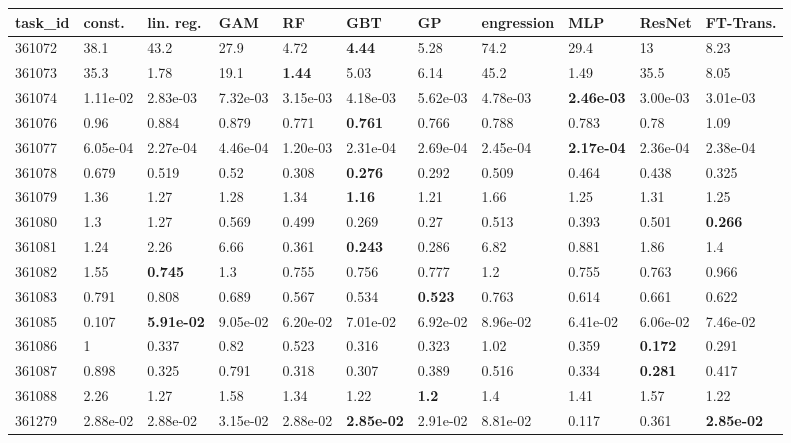 \begin{table}[ht!]
\centering
\begingroup\footnotesize
\begin{tabular}{lllllllllll}
  \hline
\hline
task\_id & const. & lin. reg. & GAM & RF & GBT & GP & engression & MLP & ResNet & FT-Trans. \\ 
  \hline
361072 & 38.1 & 43.2 & 27.9 & 4.72 & \textbf{4.44} & 5.28 & 74.2 & 29.4 & 13 & 8.23 \\ 
  361073 & 35.3 & 1.78 & 19.1 & \textbf{1.44} & 5.03 & 6.14 & 45.2 & 1.49 & 35.5 & 8.05 \\ 
  361074 & 1.11e-02 & 2.83e-03 & 7.32e-03 & 3.15e-03 & 4.18e-03 & 5.62e-03 & 4.78e-03 & \textbf{2.46e-03} & 3.00e-03 & 3.01e-03 \\ 
  361076 & 0.96 & 0.884 & 0.879 & 0.771 & \textbf{0.761} & 0.766 & 0.788 & 0.783 & 0.78 & 1.09 \\ 
  361077 & 6.05e-04 & 2.27e-04 & 4.46e-04 & 1.20e-03 & 2.31e-04 & 2.69e-04 & 2.45e-04 & \textbf{2.17e-04} & 2.36e-04 & 2.38e-04 \\ 
  361078 & 0.679 & 0.519 & 0.52 & 0.308 & \textbf{0.276} & 0.292 & 0.509 & 0.464 & 0.438 & 0.325 \\ 
  361079 & 1.36 & 1.27 & 1.28 & 1.34 & \textbf{1.16} & 1.21 & 1.66 & 1.25 & 1.31 & 1.25 \\ 
  361080 & 1.3 & 1.27 & 0.569 & 0.499 & 0.269 & 0.27 & 0.513 & 0.393 & 0.501 & \textbf{0.266} \\ 
  361081 & 1.24 & 2.26 & 6.66 & 0.361 & \textbf{0.243} & 0.286 & 6.82 & 0.881 & 1.86 & 1.4 \\ 
  361082 & 1.55 & \textbf{0.745} & 1.3 & 0.755 & 0.756 & 0.777 & 1.2 & 0.755 & 0.763 & 0.966 \\ 
  361083 & 0.791 & 0.808 & 0.689 & 0.567 & 0.534 & \textbf{0.523} & 0.763 & 0.614 & 0.661 & 0.622 \\ 
  361085 & 0.107 & \textbf{5.91e-02} & 9.05e-02 & 6.20e-02 & 7.01e-02 & 6.92e-02 & 8.96e-02 & 6.41e-02 & 6.06e-02 & 7.46e-02 \\ 
  361086 & 1 & 0.337 & 0.82 & 0.523 & 0.316 & 0.323 & 1.02 & 0.359 & \textbf{0.172} & 0.291 \\ 
  361087 & 0.898 & 0.325 & 0.791 & 0.318 & 0.307 & 0.389 & 0.516 & 0.334 & \textbf{0.281} & 0.417 \\ 
  361088 & 2.26 & 1.27 & 1.58 & 1.34 & 1.22 & \textbf{1.2} & 1.4 & 1.41 & 1.57 & 1.22 \\ 
  361279 & 2.88e-02 & 2.88e-02 & 3.15e-02 & 2.88e-02 & \textbf{2.85e-02} & 2.91e-02 & 8.81e-02 & 0.117 & 0.361 & \textbf{2.85e-02} \\ 

\end{tabular}
\end{table}
